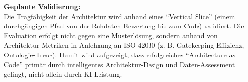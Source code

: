 \documentclass[11pt, a4paper]{article}
\begin{document}
\vspace{0.5cm}

\textbf{Geplante Validierung:} \\
Die Tragfähigkeit der Architektur wird anhand eines \enquote{Vertical Slice} (einem durchgängigen Pfad von der Rohdaten-Bewertung bis zum Code) validiert. Die Evaluation erfolgt nicht gegen eine Musterlösung, sondern anhand von Architektur-Metriken in Anlehnung an ISO 42030 (z. B. Gatekeeping-Effizienz, Ontologie-Treue). Damit wird aufgezeigt, dass erfolgreiches \enquote{Architecture as Code} primär durch intelligentes Architektur-Design und Daten-Assessment gelingt, nicht allein durch KI-Leistung.
\end{document}
